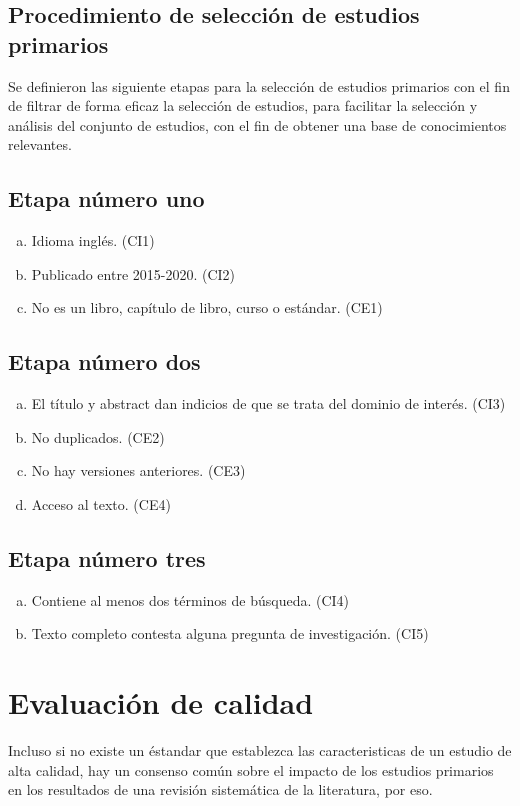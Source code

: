 \documentclass{article}
\begin{document}
\subsection{Procedimiento de selección de estudios primarios}
Se definieron las siguiente etapas para la selección de estudios primarios con el fin 
de filtrar de forma eficaz la selección de estudios, para facilitar la selección y análisis 
del conjunto de estudios, con el fin de obtener una base de conocimientos relevantes. 

\subsection{Etapa número uno}
\begin{enumerate}[(a)]
  \item{Idioma inglés. (CI1)}
  \item{Publicado entre 2015-2020. (CI2)}
  \item{No es un libro, capítulo de libro, curso o estándar. (CE1)}
\end{enumerate}

\subsection{Etapa número dos}
\begin{enumerate}[(a)]
  \item{El título y abstract dan indicios de que se trata del dominio de interés. (CI3)}
  \item{No duplicados. (CE2)}
  \item{No hay versiones anteriores. (CE3) }
  \item{Acceso al texto. (CE4)}
\end{enumerate}

\subsection{Etapa número tres}
\begin{enumerate}[(a)]
  \item{Contiene al menos dos términos de búsqueda. (CI4)}
  \item{Texto completo contesta alguna pregunta de investigación. (CI5)}
\end{enumerate}
\newpage

\section{Evaluación de calidad}
Incluso si no existe un éstandar que establezca las caracteristicas de un estudio 
de alta calidad, hay un consenso común sobre el impacto de los estudios primarios 
en los resultados de una revisión sistemática de la literatura, por eso. 
\end{document}
